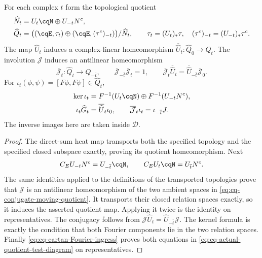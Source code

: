 \begin{cqproposition}
For each complex $t$ form the topological quotient
\begin{equation}
\begin{split}
 \widehat N_t&=U_t\cqN\oplus U_{-t}N^c,\\
 \widehat Q_t&=
 \big((\cqE,\tau_t)\oplus(\cqE,(\tau^c)_{-t})\big)/\widehat N_t,
 \qquad \tau_t=(U_t)_*\tau,\quad
 (\tau^c)_{-t}=(U_{-t})_*\tau^c .
\end{split}
\label{eq:cq-conjugate-moving-quotient}
\end{equation}
The map $\widehat U_t$ induces a complex-linear homeomorphism
$\overline{\widehat U}_t:\widehat Q_0\to\widehat Q_t$.
The involution $\mathcal J$ induces an antilinear homeomorphism
\begin{equation}
 \overline{\mathcal J}_t:\widehat Q_t\longrightarrow
       \widehat Q_{-\overline t},\qquad
 \overline{\mathcal J}_{-\overline t}\overline{\mathcal J}_t=1,
 \qquad
 \overline{\mathcal J}_t\overline{\widehat U}_t
 =\overline{\widehat U}_{-\overline t}\overline{\mathcal J}_0 .
 \label{eq:cq-actual-quotient-antiunitary-bridge}
\end{equation}
For $\iota_t(\phi,\psi)=[F\phi,F\psi]\in\widehat Q_t$,
\begin{equation}
\begin{split}
 \ker\iota_t&=F^{-1}(U_t\cqN)\oplus F^{-1}(U_{-t}N^c),\\
 \iota_t\widehat G_t&=\overline{\widehat U}_t\iota_0,\qquad
 \overline{\mathcal J}_t\iota_t=\iota_{-\overline t}J .
\end{split}
\label{eq:cq-actual-quotient-test-diagram}
\end{equation}
The inverse images here are taken inside $\mathscr D$.
\end{cqproposition}

\begin{proof}
The direct-sum heat map transports both the specified topology
and the specified closed subspace exactly, proving its quotient
homeomorphism. Next
\[
 C_EU_{-t}N^c=U_{-\overline t}\cqN,\qquad
 C_EU_t\cqN=U_{\overline t}N^c .
\]
The same identities applied to the definitions of the transported
topologies prove that $\mathcal J$ is an antilinear homeomorphism
of the two ambient spaces in \eqref{eq:cq-conjugate-moving-quotient}.
It transports their closed relation spaces exactly, so it induces
the asserted quotient map. Applying it twice is the identity
on representatives. The conjugacy follows from
$\mathcal J\widehat U_t=\widehat U_{-\overline t}\mathcal J$.
The kernel formula is exactly the condition that both Fourier
components lie in the two relation spaces. Finally
\eqref{eq:cq-cartan-Fourier-ingress} proves both equations
in \eqref{eq:cq-actual-quotient-test-diagram} on representatives.
\end{proof}

